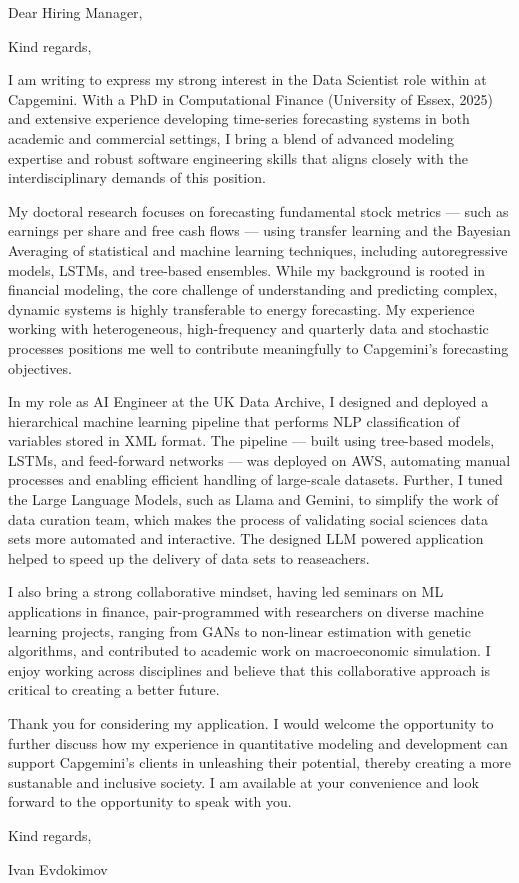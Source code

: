 \documentclass[11pt,a4paper,sans]{moderncv}
\newcommand{\companyfull}{ Capgemini }
\newcommand{\companyshort}{Capgemini}
\begin{document}
\recipient{Hiring Manager}{\companyfull \\ 1 Old Park Lane\\ Manchester, M41 7HA}
\date{\today}
\opening{Dear Hiring Manager,}
\closing{Kind regards,}

\makelettertitle

I am writing to express my strong interest in the Data Scientist role within at \companyshort. With a PhD in Computational Finance (University of Essex, 2025) and extensive experience developing time-series forecasting systems in both academic and commercial settings, I bring a blend of advanced modeling expertise and robust software engineering skills that aligns closely with the interdisciplinary demands of this position.

My doctoral research focuses on forecasting fundamental stock metrics --- such as earnings per share and free cash flows --- using transfer learning and the Bayesian Averaging of statistical and machine learning techniques, including autoregressive models, LSTMs, and tree-based ensembles.
While my background is rooted in financial modeling, the core challenge of understanding and predicting complex, dynamic systems is highly transferable to energy forecasting.
My experience working with heterogeneous, high-frequency and quarterly data and stochastic processes positions me well to contribute meaningfully to \companyshort’s forecasting objectives.

In my role as AI Engineer at the UK Data Archive, I designed and deployed a hierarchical machine learning pipeline that performs NLP classification of variables stored in XML format. The pipeline --- built using tree-based models, LSTMs, and feed-forward networks --- was deployed on AWS, automating manual processes and enabling efficient handling of large-scale datasets. 
Further, I tuned the Large Language Models, such as Llama and Gemini, to simplify the work of data curation team, which makes the process of validating social sciences data sets more automated and interactive. The designed LLM powered application helped to speed up the delivery of data sets to reaseachers. 

I also bring a strong collaborative mindset, having led seminars on ML applications in finance, pair-programmed with researchers on diverse machine learning projects, ranging from GANs to non-linear estimation with genetic algorithms, and contributed to academic work on macroeconomic simulation. I enjoy working across disciplines and believe that this collaborative approach is critical to creating a better future.

Thank you for considering my application. I would welcome the opportunity to further discuss how my experience in quantitative modeling and development can support Capgemini’s clients in unleashing their potential, thereby creating a more sustanable and inclusive society. I am available at your convenience and look forward to the opportunity to speak with you.

\vspace{0.25cm}
Kind regards,

Ivan Evdokimov
\end{document}
